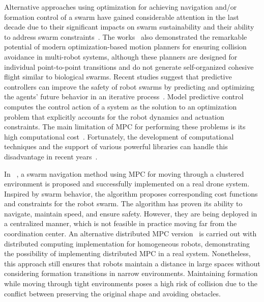 Alternative approaches using optimization for achieving navigation and/or formation control of a swarm have gained considerable attention in the last decade due to their significant impacts on swarm sustainability and their ability to address swarm constraints~\cite{Beaver2021}. The works~\cite{7828016,Wu2020} also demonstrated the remarkable potential of modern optimization-based motion planners for ensuring collision avoidance in multi-robot systems, although these planners are designed for individual point-to-point transitions and do not generate self-organized cohesive flight similar to biological swarms. Recent studies suggest that predictive controllers can improve the safety of robot swarms by predicting and optimizing the agents’ future behavior in an iterative process~\cite{Soria2021,8950150}. Model predictive control computes the control action of a system as the solution to an optimization problem that explicitly accounts for the robot dynamics and actuation constraints. The main limitation of MPC for performing these problems is its high computational cost~\cite{Darby2012,Bui2022}. Fortunately, the development of computational techniques and the support of various powerful libraries can handle this disadvantage in recent years~\cite{Soria2021,Bui2022,2020SciPy-NMeth}. %

In ~\cite{Soria2021}, a swarm navigation method using MPC for moving through a clustered environment is proposed and successfully implemented on a real drone system. Inspired by swarm behavior, the algorithm proposes corresponding cost functions and constraints for the robot swarm. The algorithm has proven its ability to navigate, maintain speed, and ensure safety. However, they are being deployed in a centralized manner, which is not feasible in practice moving far from the coordination center. An alternative distributed MPC version~\cite{9562281} is carried out with distributed computing implementation for homogeneous robots, demonstrating the possibility of implementing distributed MPC in a real system. Nonetheless, this approach still ensures that robots maintain a distance in large spaces without considering formation transitions in narrow environments. Maintaining formation while moving through tight environments poses a high risk of collision due to the conflict between preserving the original shape and avoiding obstacles.

